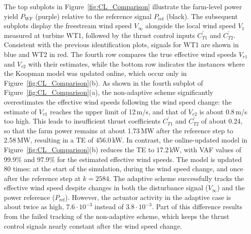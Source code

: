 The top subplots in Figure~\ref{fig:CL_Comparison} illustrate the farm-level power yield $P_{\text{WF}}$ (purple) relative to the reference signal $P_{\text{ref}}$ (black). The subsequent subplots display the freestream wind speed $V_{\infty}$ alongside the local wind speed $V_1$ measured at turbine WT1, followed by the thrust control inputs $C_{T1}^\prime$ and $C_{T2}^\prime$. Consistent with the previous identification plots, signals for WT1 are shown in blue and WT2 in red. The fourth row compares the true effective wind speeds $V_{r1}$ and  $V_{r2}$ with their estimates, while the bottom row indicates the instances where the Koopman model was updated online, which occur only in Figure~\ref{fig:CL_Comparison}(b). As shown in the fourth subplot of Figure~\ref{fig:CL_Comparison}(a), the non-adaptive scheme significantly overestimates the effective wind speeds following the wind speed change: the estimate of $V_{r1}$ reaches the upper limit of 12\,m/s, and that of $V_{r2}$ is about 0.8\,m/s too high. This leads to insufficient thrust coefficients $C_{T1}^\prime$ and $C_{T2}^\prime$ of about 0.24, so that the farm power remains at about 1.73\,MW after the reference step to 2.58\,MW, resulting in a TE of 456.0\,kW. In contrast, the online-updated model in Figure~\ref{fig:CL_Comparison}(b) reduces the TE to 17.2\,kW, with VAF values of 99.9\% and 97.9\% for the estimated effective wind speeds. The model is updated 80 times: at the start of the simulation, during the wind speed change, and once after the reference step at $k = 2584$. The adaptive scheme successfully tracks the effective wind speed despite changes in both the disturbance signal ($V_{\infty}$) and the power reference ($P_{\text{ref}}$). 
%
However, the actuator activity in the adaptive case is about twice as high, $7.6\cdot 10^{-3}$ instead of $3.8\cdot 10^{-3}$. Part of this difference results from the failed tracking of the non-adaptive scheme, which keeps the thrust control signals nearly constant after the wind speed change.

